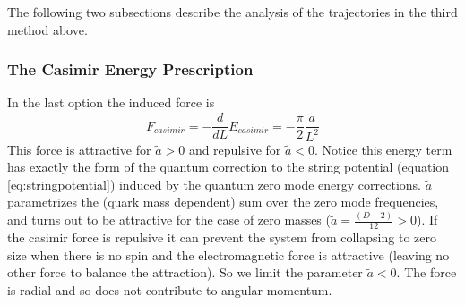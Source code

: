 \documentclass[11pt,a4paper]{article}
\begin{document}
The following two subsections describe the analysis of the trajectories in the third method above.





\FloatBarrier
\subsubsection{The Casimir Energy Prescription}
In the last option the induced force is 
\begin{equation}
F_{casimir}=-\frac{d}{dL}E_{casimir}=-\frac{\pi}{2}\frac{\tilde{a}}{L^{2}}
\end{equation}
This force is attractive for $\tilde{a}>0$ and repulsive for $\tilde{a}<0$. Notice this energy term has exactly the form of the quantum correction to the string potential (equation \ref{eq:stringpotential}) induced by the quantum zero mode energy corrections. $\tilde{a}$ parametrizes the (quark mass dependent) sum over the zero mode frequencies, and turns out to be attractive for the case of zero masses ($\tilde{a}=\frac{\left(D-2\right)}{12}>0$). If the casimir force is repulsive it can prevent the system from collapsing to zero size when there is no spin and the electromagnetic force is attractive (leaving no other force to balance the attraction). So we limit the parameter $\tilde{a}<0$. The force is radial and so does not contribute to angular momentum.
\end{document}

